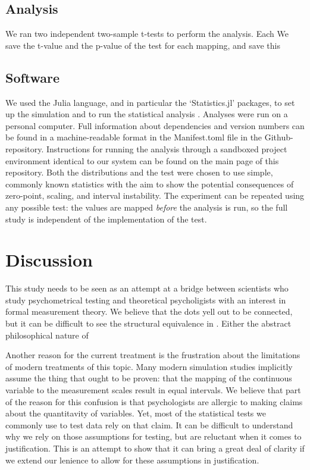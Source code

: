 \documentclass[utf8]{FrontiersinVancouver}
\begin{document}
\subsection{Analysis}
We ran two independent two-sample t-tests to perform the analysis. Each We save the t-value and the p-value of the test for each mapping, and save this 

\subsection{Software}
We used the Julia language, and in particular the `Statistics.jl' packages, to set up the simulation and to run the statistical analysis \citep{bezanson2017julia}. Analyses were run on a personal computer.  Full information about dependencies and version numbers can be found in a machine-readable format in the Manifest.toml file in the Github-repository. Instructions for running the analysis through a sandboxed project environment identical to our system can be found on the main page of this repository. Both the distributions and the test were chosen to use simple, commonly known statistics with the aim to show the potential consequences of zero-point, scaling, and interval instability. The experiment can be repeated using any possible test: the values are mapped \textit{before} the analysis is run, so the full study is independent of the implementation of the test.



\section{Discussion}

This study needs to be seen as an attempt at a bridge between scientists who study psychometrical testing and theoretical psycholigists with an interest in formal measurement theory. We believe that the dots yell out to be connected, but it can be difficult to see the structural equivalence in . Either the abstract philosophical nature of  


Another reason for the current treatment is the frustration about the limitations of modern treatments of this topic. Many modern simulation studies implicitly assume the thing that ought to be proven: that the mapping of the continuous variable to the measurement scales result in equal intervals. We believe that part of the reason for this confusion is that psychologists are allergic to making claims about the quantitavity of variables. Yet, most of the statistical tests we commonly use to test data rely on that claim. It can be difficult to understand why we rely on those assumptions for testing, but are reluctant when it comes to justification. This is an attempt to show that it can bring a great deal of clarity if we extend our lenience to allow for these assumptions in justification.
\end{document}
